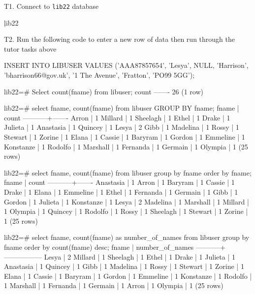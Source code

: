 
T1. Connect to \verb|lib22| database\\
\begin{sql}
\c lib22
\end{sql}

T2. Run the following code to enter a new row of data then run through the tutor tasks above
\begin{sql}
INSERT INTO LIBUSER VALUES ('AAA87857654', 'Lesya', NULL, 'Harrison', 'bharrison66@gov.uk', '1 The Avenue', 'Fratton', 'PO99 5GG');
\end{sql}

\begin{pseudo}
lib22=# Select count(fname) from libuser;
 count
-------
    26
(1 row)

lib22=# select fname, count(fname) from libuser GROUP BY fname;
   fname   | count
-----------+-------
 Arron     |     1
 Millard   |     1
 Sheelagh  |     1
 Ethel     |     1
 Drake     |     1
 Julieta   |     1
 Anastasia |     1
 Quincey   |     1
 Lesya     |     2
 Gibb      |     1
 Madelina  |     1
 Rossy     |     1
 Stewart   |     1
 Zorine    |     1
 Elana     |     1
 Cassie    |     1
 Baryram   |     1
 Gordon    |     1
 Emmeline  |     1
 Konstanze |     1
 Rodolfo   |     1
 Marshall  |     1
 Fernanda  |     1
 Germain   |     1
 Olympia   |     1
(25 rows)

lib22=# select fname, count(fname) from libuser group by fname order by fname;
   fname   | count
-----------+-------
 Anastasia |     1
 Arron     |     1
 Baryram   |     1
 Cassie    |     1
 Drake     |     1
 Elana     |     1
 Emmeline  |     1
 Ethel     |     1
 Fernanda  |     1
 Germain   |     1
 Gibb      |     1
 Gordon    |     1
 Julieta   |     1
 Konstanze |     1
 Lesya     |     2
 Madelina  |     1
 Marshall  |     1
 Millard   |     1
 Olympia   |     1
 Quincey   |     1
 Rodolfo   |     1
 Rossy     |     1
 Sheelagh  |     1
 Stewart   |     1
 Zorine    |     1
(25 rows)

lib22=# select fname, count(fname) as number_of_names from libuser group by fname order by count(fname) desc;
   fname   | number_of_names
-----------+-----------------
 Lesya     |               2
 Millard   |               1
 Sheelagh  |               1
 Ethel     |               1
 Drake     |               1
 Julieta   |               1
 Anastasia |               1
 Quincey   |               1
 Gibb      |               1
 Madelina  |               1
 Rossy     |               1
 Stewart   |               1
 Zorine    |               1
 Elana     |               1
 Cassie    |               1
 Baryram   |               1
 Gordon    |               1
 Emmeline  |               1
 Konstanze |               1
 Rodolfo   |               1
 Marshall  |               1
 Fernanda  |               1
 Germain   |               1
 Arron     |               1
 Olympia   |               1
(25 rows)


\end{pseudo}
